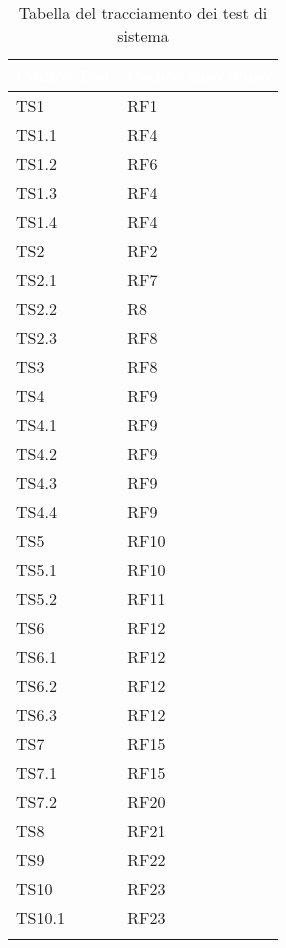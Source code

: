 {
    \setlength{\freewidth}{\dimexpr\textwidth-10\tabcolsep}
    \renewcommand{\arraystretch}{1.5}
    \centering
    \setlength{\aboverulesep}{0pt}
    \setlength{\belowrulesep}{0pt}
    \begin{longtable}{C{.25\freewidth} C{.25\freewidth}}
       \toprule
    \textcolor{white}{\textbf{Codice Test}}&
    \textcolor{white}{\textbf{Codice caso d'uso}}\\
    \toprule
    \endhead

    TS1 & RF1  \\  TS1.1 & RF4  \\   TS1.2 & RF6  \\  TS1.3 & RF4  \\
    TS1.4 & RF4  \\  TS2 & RF2  \\   TS2.1 & RF7  \\  TS2.2 & R8  \\
    TS2.3 & RF8  \\  TS3 & RF8  \\   TS4 & RF9  \\  TS4.1 & RF9  \\
    TS4.2 & RF9  \\  TS4.3 & RF9  \\   TS4.4 & RF9  \\  TS5 & RF10  \\
    TS5.1 & RF10  \\  TS5.2 & RF11  \\   TS6 & RF12  \\  TS6.1 & RF12  \\
    TS6.2 & RF12  \\  TS6.3 & RF12  \\   TS7 & RF15  \\  TS7.1 & RF15  \\
    TS7.2 & RF20  \\  TS8 & RF21  \\      TS9 & RF22  \\    TS10 & RF23  \\
    TS10.1 & RF23  \\
    
    \bottomrule
    \caption{Tabella del tracciamento dei test di sistema}
\end{longtable}
}

